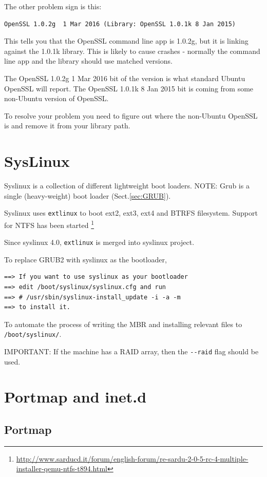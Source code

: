 The other problem sign is this:
\begin{verbatim}
OpenSSL 1.0.2g  1 Mar 2016 (Library: OpenSSL 1.0.1k 8 Jan 2015)
\end{verbatim}

This tells you that the OpenSSL command line app is 1.0.2g, but it is linking
against the 1.0.1k library. This is likely to cause crashes - normally the
command line app and the library should use matched versions.

The OpenSSL 1.0.2g  1 Mar 2016 bit of the version is what standard Ubuntu
OpenSSL will report. The OpenSSL 1.0.1k 8 Jan 2015 bit is coming from some
non-Ubuntu version of OpenSSL.

To resolve your problem you need to figure out where the non-Ubuntu OpenSSL is
and remove it from your library path.


\section{SysLinux}
\label{sec:syslinux}

Syslinux is a collection of different lightweight boot loaders. NOTE: Grub is a
single (heavy-weight) boot loader (Sect.\ref{sec:GRUB}).

Syslinux uses \verb!extlinux! to boot ext2, ext3, ext4 and BTRFS filesystem.
Support for NTFS has been started
\footnote{\url{http://www.sarducd.it/forum/english-forum/re-sardu-2-0-5-rc-4-multiple-installer-qemu-ntfs-t894.html}}


Since syslinux 4.0, \verb!extlinux! is merged into syslinux project.

To replace GRUB2 with syslinux as the bootloader, 
\begin{verbatim}
==> If you want to use syslinux as your bootloader
==> edit /boot/syslinux/syslinux.cfg and run
==> # /usr/sbin/syslinux-install_update -i -a -m
==> to install it.
\end{verbatim}
To automate the process of writing the MBR and installing relevant files to
\verb!/boot/syslinux/!. 

IMPORTANT: If the machine has a RAID array, then the \verb!--raid! flag should
be used.



\section{Portmap and inet.d}
\label{sec:portmap}

\subsection{Portmap}

